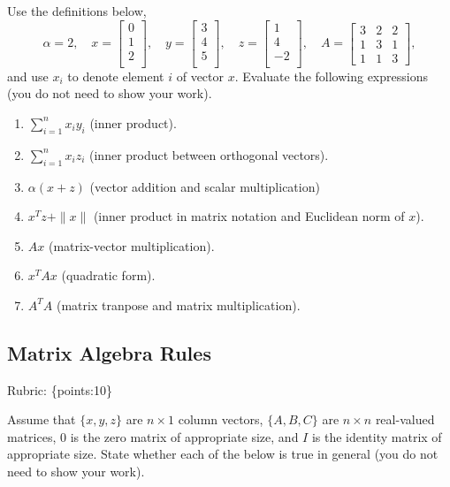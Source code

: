 \documentclass{article}
\def\rubric#1{\gre{Rubric: \{#1\}}}{}
\def\blu#1{{\color{blu}#1}}
\def\gre#1{{\color{gre}#1}}
\def\norm#1{\|#1\|}
\def\enum#1{\begin{enumerate}#1\end{enumerate}}
\begin{document}
	Use the definitions below,
	\[
	\alpha = 2,\quad
	x = \left[\begin{array}{c}
		0\\
		1\\
		2\\
	\end{array}\right], \quad
	y = \left[\begin{array}{c}
		3\\
		4\\
		5\\
	\end{array}\right],\quad
	z = \left[\begin{array}{c}
		1\\
		4\\
		-2\\
	\end{array}\right],\quad
	A = \left[\begin{array}{ccc}
		3 & 2 & 2\\
		1 & 3 & 1\\
		1 & 1 & 3
	\end{array}\right],
	\]
	and use $x_i$ to denote element $i$ of vector $x$.
	\blu{Evaluate the following expressions} (you do not need to show your work).
	\enum{
		\item $\sum_{i=1}^n x_iy_i$ (inner product).
		\item $\sum_{i=1}^n x_i z_i$ (inner product between orthogonal vectors).
		\item $\alpha(x+z)$ (vector addition and scalar multiplication)
		\item $x^Tz + \norm{x}$ (inner product in matrix notation and Euclidean norm of $x$).
		\item $Ax$ (matrix-vector multiplication).
		\item $x^TAx$ (quadratic form).
		\item $A^TA$ (matrix tranpose and matrix multiplication).
	}

	\subsection{Matrix Algebra Rules}
	\rubric{points:10}

	Assume that $\{x,y,z\}$ are $n \times 1$ column vectors, $\{A,B,C\}$ are $n \times n$ real-valued matrices, $0$ is the zero matrix of appropriate size, and $I$ is the identity matrix of appropriate size. \blu{State whether each of the below is true in general} (you do not need to show your work).
\end{document}
